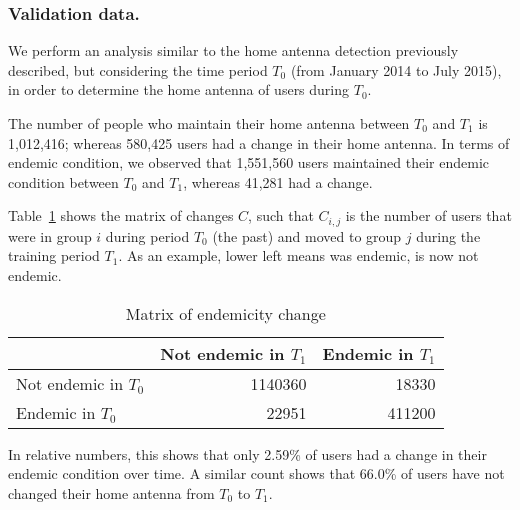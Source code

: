 

\subsubsection{Validation data.} %

We perform an analysis similar to the home antenna detection previously described, 
but considering the time period $T_0$ (from January 2014 to July 2015),
in order to determine the home antenna of users during $T_0$.

The number of people who maintain their home antenna between $T_0$ and $T_1$ is 1,012,416;
whereas 580,425 users had a change in their home antenna.
In terms of endemic condition, we observed that 1,551,560 users maintained their endemic condition
between $T_0$ and $T_1$, whereas 41,281 had a change.


%
%
%

Table~\ref{tab:changes} 
shows the matrix of changes $C$, such that $C_{i, j}$ is the number of users that were in group $i$ during period $T_0$ (the past) and moved to group $j$ during the training period $T_1$. As an example, lower left means was endemic, is now not endemic. 

\begin{table}[ht]
	\caption{Matrix of endemicity change}
	\label{tab:changes}
	\centering
	\begin{tabular}{l r r }
		\toprule
		& Not endemic in $T_1$ & Endemic in $T_1$ \\
		\midrule
		Not endemic in $T_0$ & 1140360 & 18330   \\
		Endemic in $T_0$       & 22951    & 411200 \\
		\bottomrule
	\end{tabular}
\end{table}

In relative numbers, this shows that only 2.59\% of users had a change in their endemic condition over time. A similar count shows that 66.0\% of users have not changed their home antenna from $T_0$ to $T_1$.


